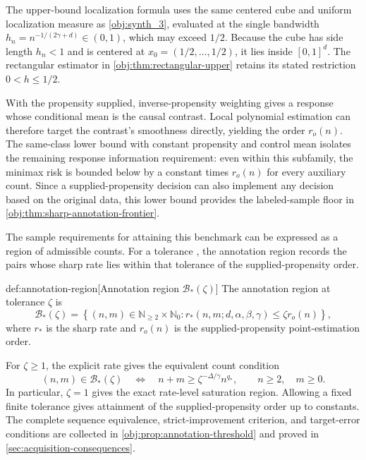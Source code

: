 The upper-bound localization formula uses the same centered cube and uniform localization measure as \cref{obj:synth_3}, evaluated at the single bandwidth \(h_n=n^{-1/(2\gamma+d)}\in(0,1)\), which may exceed \(1/2\). Because the cube has side length \(h_n<1\) and is centered at \(x_0=(1/2,\ldots,1/2)\), it lies inside \([0,1]^d\). The rectangular estimator in \cref{obj:thm:rectangular-upper} retains its stated restriction \(0<h\le1/2\).

With the propensity supplied, inverse-propensity weighting gives a response whose conditional mean is the causal contrast. Local polynomial estimation can therefore target the contrast's smoothness directly, yielding the order \(r_o(n)\). The same-class lower bound with constant propensity and control mean isolates the remaining response information requirement: even within this subfamily, the minimax risk is bounded below by a constant times \(r_o(n)\) for every auxiliary count. Since a supplied-propensity decision can also implement any decision based on the original data, this lower bound provides the labeled-sample floor in \cref{obj:thm:sharp-annotation-frontier}.

The sample requirements for attaining this benchmark can be expressed as a region of admissible counts. For a tolerance , the annotation region  records the pairs whose sharp rate lies within that tolerance of the supplied-propensity order.

\begin{definitionv}{def:annotation-region}[Annotation region \(\mathcal B_*(\zeta)\)]
The annotation region at tolerance \(\zeta\) is
\[
\mathcal B_*(\zeta)=
\left\{
(n,m)\in\mathbb N_{\ge2}\times\mathbb N_0:
r_*(n,m;d,\alpha,\beta,\gamma)\le\zeta r_o(n)
\right\},
\]
where \(r_*\) is the sharp rate and \(r_o(n)\) is the supplied-propensity point-estimation order.
\end{definitionv}

For \(\zeta\ge1\), the explicit rate gives the equivalent count condition
\[
(n,m)\in\mathcal B_*(\zeta)
\quad\Longleftrightarrow\quad
n+m\ge \zeta^{-\Delta/\gamma}n^{q_*},
\qquad n\ge2,\quad m\ge0.
\]
In particular, \(\zeta=1\) gives the exact rate-level saturation region. Allowing a fixed finite tolerance gives attainment of the supplied-propensity order up to constants. The complete sequence equivalence, strict-improvement criterion, and target-error conditions are collected in \cref{obj:prop:annotation-threshold} and proved in \cref{sec:acquisition-consequences}.

